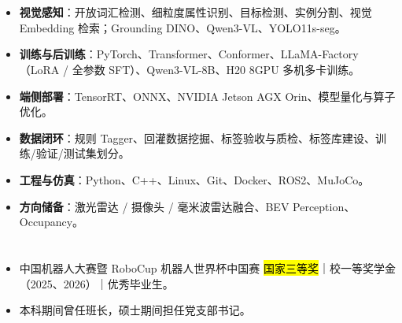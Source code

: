 \section[专业技能]{}
\begin{itemize}
    \item \textbf{视觉感知}：开放词汇检测、细粒度属性识别、目标检测、实例分割、视觉 Embedding 检索；Grounding DINO、Qwen3-VL、YOLO11s-seg。
    \item \textbf{训练与后训练}：PyTorch、Transformer、Conformer、LLaMA-Factory（LoRA / 全参数 SFT）、Qwen3-VL-8B、H20 8GPU 多机多卡训练。
    \item \textbf{端侧部署}：TensorRT、ONNX、NVIDIA Jetson AGX Orin、模型量化与算子优化。
    \item \textbf{数据闭环}：规则 Tagger、回灌数据挖掘、标签验收与质检、标签库建设、训练/验证/测试集划分。
    \item \textbf{工程与仿真}：Python、C++、Linux、Git、Docker、ROS2、MuJoCo。
    \item \textbf{方向储备}：激光雷达 / 摄像头 / 毫米波雷达融合、BEV Perception、Occupancy。
\end{itemize}

\section[荣誉与综合素质]{}
\begin{itemize}
    \item 中国机器人大赛暨 RoboCup 机器人世界杯中国赛 \hl{国家三等奖}｜校一等奖学金（2025、2026）｜优秀毕业生。
    \item 本科期间曾任班长，硕士期间担任党支部书记。
\end{itemize}


